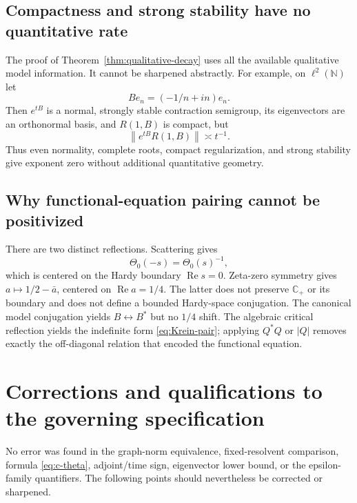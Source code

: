 \documentclass[11pt]{amsart}
\theoremstyle{definition}
\theoremstyle{remark}
\DeclareMathOperator{\Repart}{Re}
\newcommand{\C}{\mathbb C}
\newcommand{\norm}[1]{\left\lVert #1\right\rVert}
\newcommand{\abs}[1]{\left\lvert #1\right\rvert}
\begin{document}
\subsection{Compactness and strong stability have no quantitative rate}

The proof of Theorem~\ref{thm:qualitative-decay} uses all the available
qualitative model information.  It cannot be sharpened abstractly.  For
example, on $\ell^2(\mathbb N)$ let
\[
 Be_n=(-1/n+in)e_n.
\]
Then $e^{tB}$ is a normal, strongly stable contraction semigroup, its
eigenvectors are an orthonormal basis, and $R(1,B)$ is compact, but
\[
 \norm{e^{tB}R(1,B)}\asymp t^{-1}.
\]
Thus even normality, complete roots, compact regularization, and strong
stability give exponent zero without additional quantitative geometry.

\subsection{Why functional-equation pairing cannot be positivized}

There are two distinct reflections.  Scattering gives
\[
 \Theta_0(-s)=\Theta_0(s)^{-1},
\]
which is centered on the Hardy boundary $\Repart s=0$.  Zeta-zero symmetry
gives $a\mapsto1/2-\bar a$, centered on $\Repart a=1/4$.  The latter does not
preserve $\C_+$ or its boundary and does not define a bounded Hardy-space
conjugation.  The canonical model conjugation yields $B\leftrightarrow B^*$
but no $1/4$ shift.  The algebraic critical reflection yields the indefinite
form \eqref{eq:Krein-pair}; applying $Q^*Q$ or $\abs Q$ removes exactly the
off-diagonal relation that encoded the functional equation.

\section{Corrections and qualifications to the governing specification}
\label{sec:specification-errors}

No error was found in the graph-norm equivalence, fixed-resolvent comparison,
formula \eqref{eq:c-theta}, adjoint/time sign, eigenvector lower bound, or the
epsilon-family quantifiers.  The following points should nevertheless be
corrected or sharpened.
\end{document}
